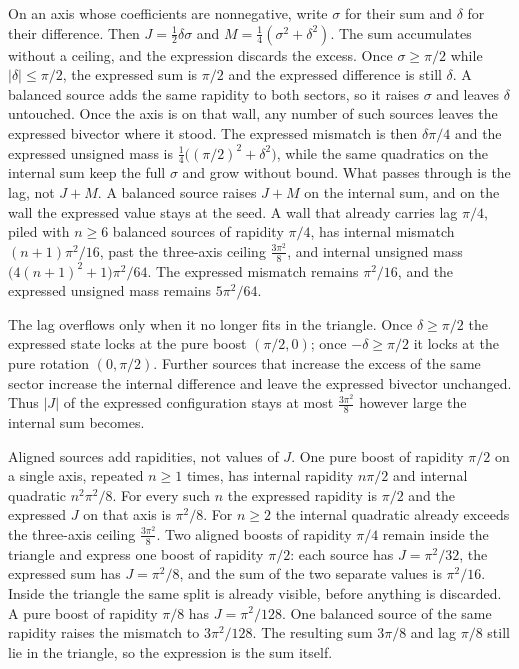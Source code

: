 \documentclass[a4paper]{article}
\newcommand{\Jbound}{\frac{3\pi^2}{8}}
\begin{document}
On an axis whose coefficients are nonnegative, write $\sigma$ for their sum and $\delta$ for their difference. Then $J=\tfrac12\delta\sigma$ and $M=\tfrac14(\sigma^2+\delta^2)$. The sum accumulates without a ceiling, and the expression discards the excess. Once $\sigma\ge\pi/2$ while $|\delta|\le\pi/2$, the expressed sum is $\pi/2$ and the expressed difference is still $\delta$. A balanced source adds the same rapidity to both sectors, so it raises $\sigma$ and leaves $\delta$ untouched. Once the axis is on that wall, any number of such sources leaves the expressed bivector where it stood. The expressed mismatch is then $\delta\pi/4$ and the expressed unsigned mass is $\tfrac14\bigl((\pi/2)^2+\delta^2\bigr)$, while the same quadratics on the internal sum keep the full $\sigma$ and grow without bound. What passes through is the lag, not $J+M$. A balanced source raises $J+M$ on the internal sum, and on the wall the expressed value stays at the seed. A wall that already carries lag $\pi/4$, piled with $n\ge 6$ balanced sources of rapidity $\pi/4$, has internal mismatch $(n+1)\pi^2/16$, past the three-axis ceiling $\Jbound$, and internal unsigned mass $\bigl(4(n+1)^2+1\bigr)\pi^2/64$. The expressed mismatch remains $\pi^2/16$, and the expressed unsigned mass remains $5\pi^2/64$.

The lag overflows only when it no longer fits in the triangle. Once $\delta\ge\pi/2$ the expressed state locks at the pure boost $(\pi/2,0)$; once $-\delta\ge\pi/2$ it locks at the pure rotation $(0,\pi/2)$. Further sources that increase the excess of the same sector increase the internal difference and leave the expressed bivector unchanged. Thus $|J|$ of the expressed configuration stays at most $\Jbound$ however large the internal sum becomes.

Aligned sources add rapidities, not values of $J$. One pure boost of rapidity $\pi/2$ on a single axis, repeated $n\ge 1$ times, has internal rapidity $n\pi/2$ and internal quadratic $n^2\pi^2/8$. For every such $n$ the expressed rapidity is $\pi/2$ and the expressed $J$ on that axis is $\pi^2/8$. For $n\ge 2$ the internal quadratic already exceeds the three-axis ceiling $\Jbound$. Two aligned boosts of rapidity $\pi/4$ remain inside the triangle and express one boost of rapidity $\pi/2$: each source has $J=\pi^2/32$, the expressed sum has $J=\pi^2/8$, and the sum of the two separate values is $\pi^2/16$. Inside the triangle the same split is already visible, before anything is discarded. A pure boost of rapidity $\pi/8$ has $J=\pi^2/128$. One balanced source of the same rapidity raises the mismatch to $3\pi^2/128$. The resulting sum $3\pi/8$ and lag $\pi/8$ still lie in the triangle, so the expression is the sum itself.
\end{document}
